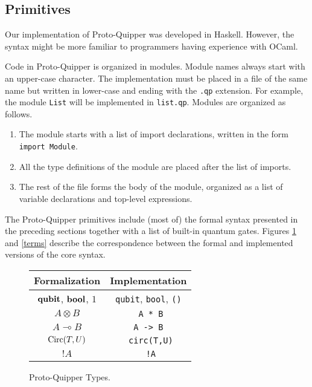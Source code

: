 \subsection{Primitives}

Our implementation of Proto-Quipper was developed in Haskell. However, the 
syntax might be more familiar to programmers having experience with OCaml.

Code in Proto-Quipper is organized in modules. Module names always start 
with an upper-case character. The implementation must be placed in a file 
of the same name but written in lower-case and ending with the {\tt.qp} 
extension. For example, the module {\tt List} will be implemented in 
{\tt list.qp}. Modules are organized as follows.
\begin{enumerate}
  \item The module starts with a list of import declarations, written 
  in the form {\tt import Module}.
  \item All the type definitions of the module are placed after the list 
  of imports.
  \item The rest of the file forms the body of the module, organized as a 
  list of variable declarations and top-level expressions.
\end{enumerate}

The Proto-Quipper primitives include (most of) the formal syntax presented 
in the preceding sections together with a list of built-in quantum gates. 
Figures \hyperref[types]{\ref*{types}} and \hyperref[terms]{\ref*{terms}} 
describe the correspondence between the formal and implemented versions of 
the core syntax.

\begin{figure}[!ht]
\begin{center}
\renewcommand{\arraystretch}{1.4}
\begin{tabular}{|c|c|}
  \hline
  \textbf{Formalization}    & \textbf{Implementation} \\\hline
  $\textrm{\bf qubit}$, $\textrm{\bf bool}$, $1$    & \verb#qubit#, \verb#bool#, \verb#()# \\\hline
  $A \otimes B$             & \verb# A * B# \\\hline
  $A \multimap B$           & \verb# A -> B # \\\hline
  $\mathop{\textrm{Circ}}\nolimits(T, U)$              & \verb# circ(T,U)# \\\hline
  ${!} A$                   & \verb# !A# \\\hline
\end{tabular}
\end{center}
\caption{Proto-Quipper Types.}
\label{types}
\end{figure}

